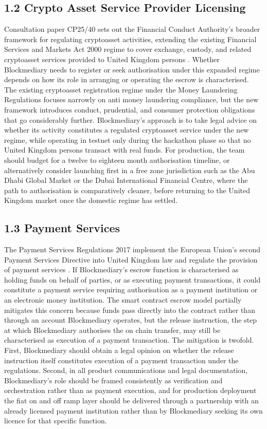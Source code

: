 \documentclass[12pt, a4paper]{article}
\begin{document}
\subsection*{1.2 Crypto Asset Service Provider Licensing}

Consultation paper CP25/40 sets out the Financial Conduct Authority's broader framework
for regulating cryptoasset activities, extending the existing Financial Services and
Markets Act 2000 regime to cover exchange, custody, and related cryptoasset services
provided to United Kingdom persons \citep{fcacp2540}. Whether Blockmediary needs to
register or seek authorisation under this expanded regime depends on how its role in
arranging or operating the escrow is characterised. The existing cryptoasset registration
regime under the Money Laundering Regulations focuses narrowly on anti money laundering
compliance, but the new framework introduces conduct, prudential, and consumer protection
obligations that go considerably further. Blockmediary's approach is to take legal advice
on whether its activity constitutes a regulated cryptoasset service under the new regime,
while operating in testnet only during the hackathon phase so that no United Kingdom
persons transact with real funds. For production, the team should budget for a
twelve to eighteen month authorisation timeline, or alternatively consider launching first
in a free zone jurisdiction such as the Abu Dhabi Global Market or the Dubai International
Financial Centre, where the path to authorisation is comparatively cleaner, before
returning to the United Kingdom market once the domestic regime has settled.

\subsection*{1.3 Payment Services}

The Payment Services Regulations 2017 implement the European Union's second Payment
Services Directive into United Kingdom law and regulate the provision of payment services
\citep{ukpsr2017}. If Blockmediary's escrow function is characterised as holding funds on
behalf of parties, or as executing payment transactions, it could constitute a payment
service requiring authorisation as a payment institution or an electronic money
institution. The smart contract escrow model partially mitigates this concern because
funds pass directly into the contract rather than through an account Blockmediary
operates, but the release instruction, the step at which Blockmediary authorises the on
chain transfer, may still be characterised as execution of a payment transaction. The
mitigation is twofold. First, Blockmediary should obtain a legal opinion on whether the
release instruction itself constitutes execution of a payment transaction under the
regulations. Second, in all product communications and legal documentation, Blockmediary's
role should be framed consistently as verification and orchestration rather than as
payment execution, and for production deployment the fiat on and off ramp layer should be
delivered through a partnership with an already licensed payment institution rather than
by Blockmediary seeking its own licence for that specific function.
\end{document}
